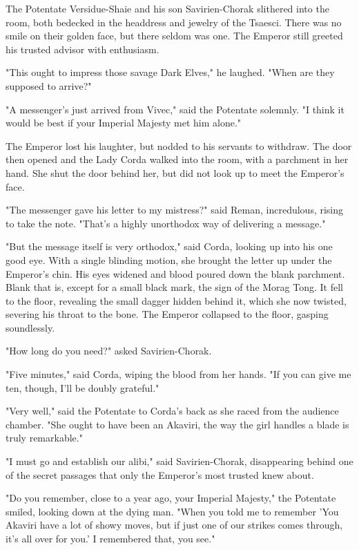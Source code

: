 The Potentate Versidue-Shaie and his son Savirien-Chorak slithered into the room, both bedecked in the headdress and jewelry of the Tsaesci. There was no smile on their golden face, but there seldom was one. The Emperor still greeted his trusted advisor with enthusiasm.

"This ought to impress those savage Dark Elves," he laughed. "When are they supposed to arrive?"

"A messenger's just arrived from Vivec," said the Potentate solemnly. "I think it would be best if your Imperial Majesty met him alone."

The Emperor lost his laughter, but nodded to his servants to withdraw. The door then opened and the Lady Corda walked into the room, with a parchment in her hand. She shut the door behind her, but did not look up to meet the Emperor's face.

"The messenger gave his letter to my mistress?" said Reman, incredulous, rising to take the note. "That's a highly unorthodox way of delivering a message."

"But the message itself is very orthodox," said Corda, looking up into his one good eye. With a single blinding motion, she brought the letter up under the Emperor's chin. His eyes widened and blood poured down the blank parchment. Blank that is, except for a small black mark, the sign of the Morag Tong. It fell to the floor, revealing the small dagger hidden behind it, which she now twisted, severing his throat to the bone. The Emperor collapsed to the floor, gasping soundlessly.

"How long do you need?" asked Savirien-Chorak.

"Five minutes," said Corda, wiping the blood from her hands. "If you can give me ten, though, I'll be doubly grateful."

"Very well," said the Potentate to Corda's back as she raced from the audience chamber. "She ought to have been an Akaviri, the way the girl handles a blade is truly remarkable."

"I must go and establish our alibi," said Savirien-Chorak, disappearing behind one of the secret passages that only the Emperor's most trusted knew about.

"Do you remember, close to a year ago, your Imperial Majesty," the Potentate smiled, looking down at the dying man. "When you told me to remember 'You Akaviri have a lot of showy moves, but if just one of our strikes comes through, it's all over for you.' I remembered that, you see."

